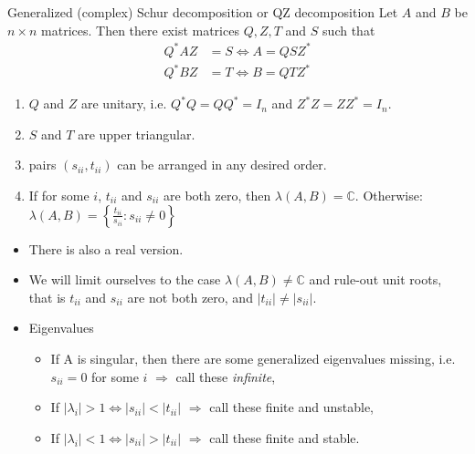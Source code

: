 \documentclass[handout]{beamer}  %
\begin{document}
\begin{frame}[shrink]\scriptsize
\frametitle{\secname}\framesubtitle{}
\begin{block}{Generalized (complex) Schur decomposition or QZ decomposition}
Let $A$ and $B$ be $n\times n$ matrices. Then there exist matrices $Q,Z,T$ and $S$ such that
\begin{align*}
  Q^* A Z &= S \Leftrightarrow A = Q S Z^*\\
  Q^* B Z &= T \Leftrightarrow B = Q T Z^*
\end{align*}
\begin{enumerate}
  \item $Q$ and $Z$ are unitary, i.e. $Q^*Q=QQ^*=I_n$ and $Z^*Z=ZZ^*=I_n$.
  \item $S$ and $T$ are upper triangular.
 \item pairs $(s_{ii},t_{ii})$ can be arranged in any desired order.
  \item If for some $i$, $t_{ii}$ and $s_{ii}$ are both zero, then $\lambda(A,B)=\mathbb{C}$. Otherwise:
$\lambda(A,B) = \left\{\frac{t_{ii}}{s_{ii}}:s_{ii} \neq 0 \right\}$
\end{enumerate}
\end{block}
\begin{itemize}\scriptsize
  \item There is also a real version.
  \item We will limit ourselves to the case $\lambda(A,B)\neq \mathbb{C}$ and rule-out unit roots, that is $t_{ii}$ and $s_{ii}$ are not both zero, and $|t_{ii}|\neq |s_{ii}|$.
  \item Eigenvalues
  \begin{itemize}\scriptsize
  \item If A is singular, then there are some generalized eigenvalues missing, i.e. $s_{ii}=0$ for some $i$ $\Rightarrow$ call these \emph{infinite},
  \item If $|\lambda_i|>1 \Leftrightarrow |s_{ii}|<|t_{ii}|$ $\Rightarrow$ call these finite and unstable,
  \item If $|\lambda_i|<1 \Leftrightarrow |s_{ii}|>|t_{ii}|$ $\Rightarrow$ call these finite and stable.
  \end{itemize}
\end{itemize}
\end{frame}
\end{document}
